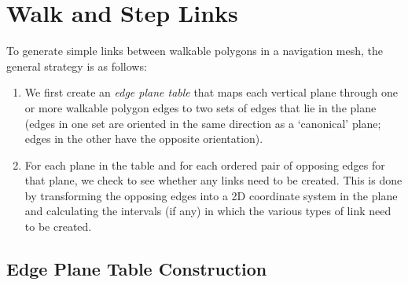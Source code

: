\documentclass[10pt,twocolumn]{article}
\begin{document}
\section{Walk and Step Links}
\label{sec:walkstep}

To generate simple links between walkable polygons in a navigation mesh, the general strategy is as follows:
%
\begin{enumerate}
\item We first create an \emph{edge plane table} that maps each vertical plane through one or more walkable polygon edges to two sets of edges that lie in the plane (edges in one set are oriented in the same direction as a `canonical' plane; edges in the other have the opposite orientation).
\item For each plane in the table and for each ordered pair of opposing edges for that plane, we check to see whether any links need to be created. This is done by transforming the opposing edges into a 2D coordinate system in the plane and calculating the intervals (if any) in which the various types of link need to be created.
\end{enumerate}

\subsection{Edge Plane Table Construction}
\end{document}
